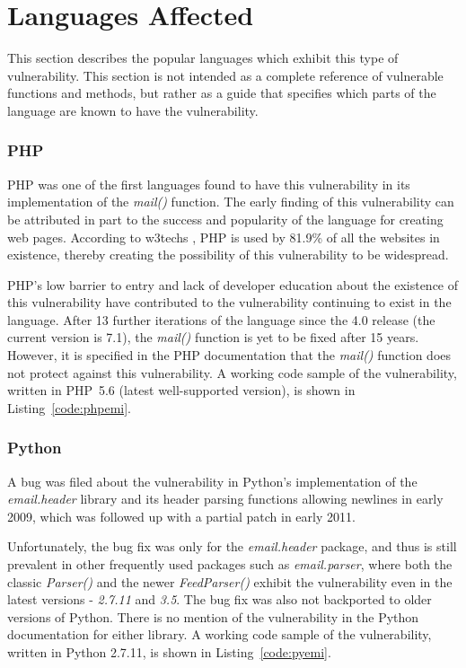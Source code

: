 \section{Languages Affected}
\label{languages}
This section describes the popular languages which exhibit this type of vulnerability. This section is not intended as a complete reference of vulnerable functions and methods, but rather as a guide that specifies which parts of the language are known to have the vulnerability.

\subsubsection{PHP} 
PHP was one of the first languages found to have this vulnerability in its implementation of the \emph{mail()} function. The early finding of this vulnerability can be attributed in part to the success and popularity of the language for creating web pages. According to w3techs \cite{W3techs}, PHP is used by 81.9\% of all the websites in existence, thereby creating the possibility of this vulnerability to be widespread. 

PHP's low barrier to entry and lack of developer education about the existence of this vulnerability have contributed to the vulnerability continuing to exist in the language.
After 13 further iterations of the language since the 4.0 release (the current version is 7.1), the \emph{mail()} function is yet to be fixed after 15 years. However, it is specified in the PHP documentation \cite{PHPDocs} that the \emph{mail()} function does not protect against this vulnerability.
A working code sample of the vulnerability, written in PHP~5.6 (latest well-supported version), is shown in  Listing~\ref{code:phpemi}.


\subsubsection{Python} 
A bug was filed about the vulnerability in Python's implementation of the \emph{email.header} library and its header parsing functions allowing newlines in early 2009, which was followed up with a partial patch in early 2011. 

Unfortunately, the bug fix was only for the \emph{email.header} package, and thus is still prevalent in other frequently used packages such as \emph{email.parser}, where both the classic \emph{Parser()} and the newer \emph{FeedParser()} exhibit the vulnerability even in the latest versions - \emph{2.7.11} and \emph{3.5}. The bug fix was also not backported to older versions of Python. 
There is no mention of the vulnerability in the Python documentation for either library.
A working code sample of the vulnerability, written in Python 2.7.11, is shown in Listing~\ref{code:pyemi}.


